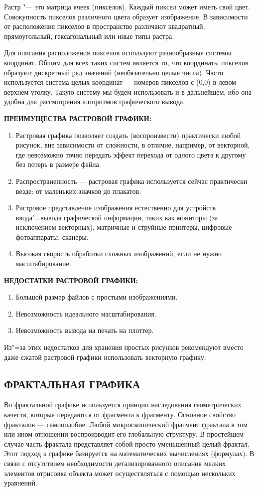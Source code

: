 \documentclass[referat]{SCWorks}
\begin{document}
Растр "--- это матрица ячеек (пикселов). Каждый пиксел может иметь свой цвет. Совокупность пикселов различного цвета образует изображение. В зависимости от расположения пикселов в пространстве различают квадратный, прямоугольный, гексагональный или иные типы растра. 

Для описания расположения пикселов используют разнообразные системы координат. Общим для всех таких систем является то, что координаты пикселов образуют дискретный ряд значений (необязательно целые числа). Часто используется система целых координат — номеров пикселов с (0,0) в левом верхнем уголку. Такую систему мы будем использовать и в дальнейшем, ибо она удобна для рассмотрения алгоритмов графического вывода\cite{Porev2002}.

\textbf{ПРЕИМУЩЕСТВА РАСТРОВОЙ ГРАФИКИ:}
\begin{enumerate}
    \item Растровая графика позволяет создать (воспроизвести) практически любой рисунок, вне зависимости от сложности, в отличие, например, от векторной, где невозможно точно передать эффект перехода от одного цвета к другому без потерь в размере файла.
    \item Распространенность — растровая графика используется сейчас практически везде: от маленьких значков до плакатов. 
    \item Растровое представление изображения естественно для устройств ввода"=вывода графической информации, таких как мониторы (за исключением векторных), матричные и струйные принтеры, цифровые фотоаппараты, сканеры.
    \item Высокая скорость обработки сложных изображений, если не нужно масштабирование.
\end{enumerate}

\textbf{НЕДОСТАТКИ РАСТРОВОЙ ГРАФИКИ:}
\begin{enumerate}
    \item Большой размер файлов с простыми изображениями.
    \item Невозможность идеального масштабирования.
    \item Невозможность вывода на печать на плоттер.
\end{enumerate}

Из"=за этих недостатков для хранения простых рисунков рекомендуют вместо даже сжатой растровой графики использовать векторную графику.

\subsection{ФРАКТАЛЬНАЯ ГРАФИКА}
Во фрактальной графике используется принцип наследования геометрических качеств, которые передаются от фрагмента к фрагменту. Основное свойство фракталов — самоподобие. Любой микроскопический фрагмент фрактала в том или ином отношении воспроизводит его глобальную структуру. В простейшем случае часть фрактала представляет собой просто уменьшенный целый фрактал\cite{Balykina2008}. Этот подход к графике базируется на математических вычислениях (формулах). В связи с отсутствием необходимости детализированного описания мелких элементов отрисовка объекта может осуществляться с помощью нескольких уравнений.
\end{document}
